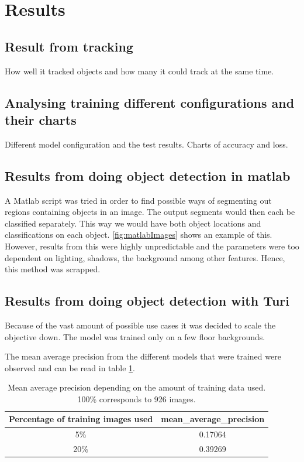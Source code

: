 \section{Results}
\subsection{Result from tracking}

How well it tracked objects and how many it could track at the same time.

\subsection{Analysing training different configurations and their charts}

Different model configuration and the test results. Charts of accuracy and loss.

\subsection{Results from doing object detection in matlab}
A Matlab script was tried in order to find possible ways of segmenting out regions containing objects in an image. The output segments would then each be classified separately. This way we would have both object locations and classifications on each object. \ref{fig:matlabImages} shows an example of this. However, results from this were highly unpredictable and the parameters were too dependent on lighting, shadows, the background among other features. Hence, this method was scrapped.

\subsection{Results from doing object detection with Turi}
Because of the vast amount of possible use cases it was decided to scale the objective down. The model was trained only on a few floor backgrounds. 

The mean average precision from the different models that were trained were observed and can be read in table \ref{table:mAP}. 

\begin{table}[h]
\centering
\begin{tabular}{ |c|c| } 
 \hline
 Percentage of training images used & mean\_average\_precision  \\ 
 \hline
 5\% & 0.17064 \\ 
 \hline
 20\% & 0.39269 \\ 
 \hline
\end{tabular}
\caption{Mean average precision depending on the amount of training data used. 100\% corresponds to 926 images.}
\label{table:mAP}
\end{table}

